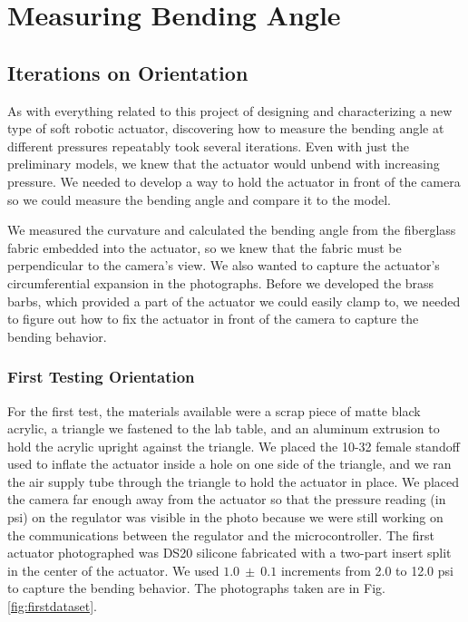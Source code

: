 \chapter{Measuring Bending Angle}
\label{chapter:bendingangle}

\section{Iterations on Orientation}

As with everything related to this project of designing and characterizing a new type of soft robotic actuator, discovering how to measure the bending angle at different pressures repeatably took several iterations. Even with just the preliminary models, we knew that the actuator would unbend with increasing pressure. We needed to develop a way to hold the actuator in front of the camera so we could measure the bending angle and compare it to the model. 

We measured the curvature and calculated the bending angle from the fiberglass fabric embedded into the actuator, so we knew that the fabric must be perpendicular to the camera's view. We also wanted to capture the actuator's circumferential expansion in the photographs. Before we developed the brass barbs, which provided a part of the actuator we could easily clamp to, we needed to figure out how to fix the actuator in front of the camera to capture the bending behavior. 

\subsection{First Testing Orientation}

For the first test, the materials available were a scrap piece of matte black acrylic, a triangle we fastened to the lab table, and an aluminum extrusion to hold the acrylic upright against the triangle. We placed the 10-32 female standoff used to inflate the actuator inside a hole on one side of the triangle, and we ran the air supply tube through the triangle to hold the actuator in place. We placed the camera far enough away from the actuator so that the pressure reading (in psi) on the regulator was visible in the photo because we were still working on the communications between the regulator and the microcontroller. The first actuator photographed was DS20 silicone fabricated with a two-part insert split in the center of the actuator. We used $1.0~\pm~0.1$ increments from 2.0 to 12.0 psi to capture the bending behavior. The photographs taken are in Fig. \ref{fig:firstdataset}. 

